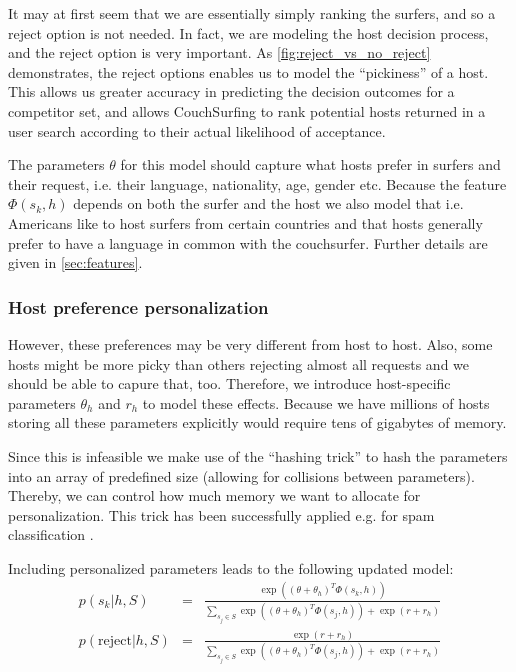 It may at first seem that we are essentially simply ranking the surfers, and so a reject option is not needed.
In fact, we are modeling the host decision process, and the reject option is very important.
As \autoref{fig:reject_vs_no_reject} demonstrates, the reject options enables us to model the ``pickiness'' of a host.
This allows us greater accuracy in predicting the decision outcomes for a competitor set, and allows CouchSurfing to rank potential hosts returned in a user search according to their actual likelihood of acceptance.

The parameters $\theta$ for this model should capture what hosts prefer in surfers and their request, i.e. their language, nationality, age, gender etc.
Because the feature $\Phi(s_k,h)$ depends on both the surfer and the host we also model that i.e. Americans like to host surfers from certain countries and that hosts generally prefer to have a language in common with the couchsurfer.
Further details are given in \autoref{sec:features}.

\subsubsection{Host preference personalization}
However, these preferences may be very different from host to host.
Also, some hosts might be more picky than others rejecting almost all requests and we should be able to capure that, too.
Therefore, we introduce host-specific parameters $\theta_h$ and $r_h$ to model these effects.
Because we have millions of hosts storing all these parameters explicitly would require tens of gigabytes of memory.

Since this is infeasible we make use of the ``hashing trick'' to hash the parameters into an array of predefined size (allowing for collisions between parameters).
Thereby, we can control how much memory we want to allocate for personalization.
This trick has been successfully applied e.g. for spam classification \cite{Attenberg2009}.

Including personalized parameters leads to the following updated model:
\begin{eqnarray}
p(s_k | h, S) &=& \frac{\exp((\theta + \theta_h)^T \Phi(s_k,h))}{\sum_{s_j \in S} \exp((\theta + \theta_h)^T \Phi(s_j,h)) + \exp(r + r_{h})} \\
p(\text{reject} | h, S) &=& \frac{\exp(r+r_{h})}{\sum_{s_j \in S} \exp((\theta + \theta_h)^T \Phi(s_j,h)) + \exp(r + r_{h})}
\end{eqnarray}

